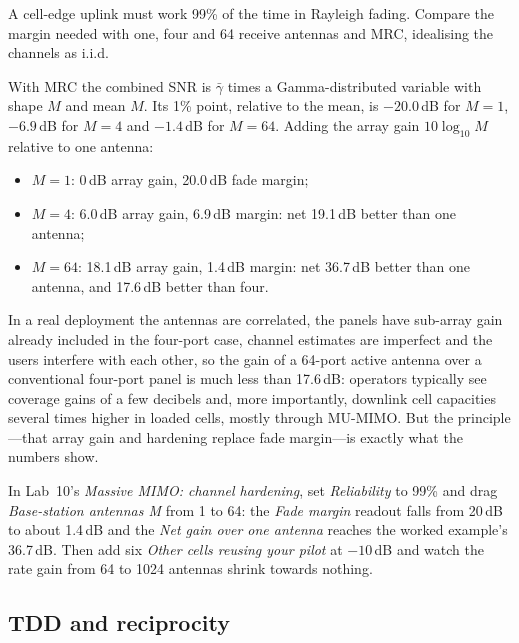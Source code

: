 \begin{worked}
A cell-edge uplink must work 99\% of the time in Rayleigh fading. Compare the margin needed with
one, four and 64 receive antennas and MRC, idealising the channels as i.i.d.

With MRC the combined SNR is $\bar\gamma$ times a Gamma-distributed variable with shape $M$ and mean
$M$. Its 1\% point, relative to the mean, is $-20.0$\,dB for $M=1$, $-6.9$\,dB for $M=4$ and
$-1.4$\,dB for $M=64$. Adding the array gain $10\log_{10}M$ relative to one antenna:
\begin{itemize}
\item $M=1$: $0$\,dB array gain, 20.0\,dB fade margin;
\item $M=4$: 6.0\,dB array gain, 6.9\,dB margin: net 19.1\,dB better than one antenna;
\item $M=64$: 18.1\,dB array gain, 1.4\,dB margin: net 36.7\,dB better than one antenna, and
17.6\,dB better than four.
\end{itemize}
In a real deployment the antennas are correlated, the panels have sub-array gain already included
in the four-port case, channel estimates are imperfect and the users interfere with each other, so
the gain of a 64-port active antenna over a conventional four-port panel is much less than 17.6\,dB:
operators typically see coverage gains of a few decibels and, more importantly, downlink cell
capacities several times higher in loaded cells, mostly through MU-MIMO. But the principle---that
array gain and hardening replace fade margin---is exactly what the numbers show.
\end{worked}

\begin{tryit}
In Lab~10's \emph{Massive MIMO: channel hardening}, set \emph{Reliability} to 99\% and drag
\emph{Base-station antennas M} from 1 to 64: the \emph{Fade margin} readout falls from 20\,dB to
about 1.4\,dB and the \emph{Net gain over one antenna} reaches the worked example's 36.7\,dB. Then
add six \emph{Other cells reusing your pilot} at $-10$\,dB and watch the rate gain from 64 to 1024
antennas shrink towards nothing.
\end{tryit}

\subsection{TDD and reciprocity}

